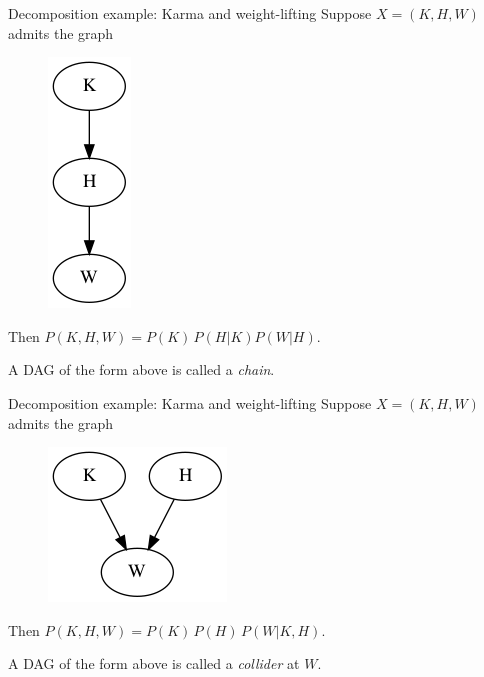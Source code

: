 \begin{frame}{Decomposition example: Karma and weight-lifting}
  Suppose $X = (K, H, W)$ admits the graph
  \begin{figure}[ht]
    \centering
    \includegraphics[height=0.5\textheight]{graphics/karma_chain}
  \end{figure}

  Then $P(K, H, W) = P(K) \, P(H | K) P(W | H) $.

  \begin{definition}
    A DAG of the form above is called a \emph{chain}.
  \end{definition}
\end{frame}


\begin{frame}{Decomposition example: Karma and weight-lifting}
  Suppose $X = (K, H, W)$ admits the graph
  \begin{figure}[ht]
    \centering
    \includegraphics[height=0.5\textheight]{graphics/karma_collider}
  \end{figure}

  Then $P(K, H, W) = P(K) \, P(H) \, P(W | K, H)$.
  \begin{definition}
    A DAG of the form above is called a \emph{collider} at $W$.
  \end{definition}
\end{frame}

